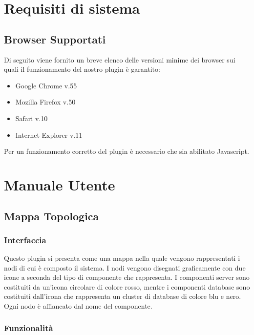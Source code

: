 \section{Requisiti di sistema}
\subsection{Browser Supportati}

Di seguito viene fornito un breve elenco delle versioni minime dei browser sui quali il funzionamento del nostro plugin è garantito:
\begin{itemize}
	
	\item Google Chrome v.55
	\item Mozilla Firefox v.50
	\item Safari v.10
	\item Internet Explorer v.11
	
\end{itemize}

Per un funzionamento corretto del plugin è necessario che sia abilitato Javascript.


\section{Manuale Utente}
\subsection{Mappa Topologica}
\label{sec:mtopologica}
\subsubsection{Interfaccia}
Questo plugin si presenta come una mappa nella quale vengono rappresentati i nodi di cui è composto il sistema.
I nodi vengono disegnati graficamente con due icone a seconda del tipo di componente che rappresenta. I componenti server sono costituiti da un'icona circolare di colore rosso, mentre i componenti database sono costituiti dall'icona che rappresenta un cluster di database di colore blu e nero. Ogni nodo è affiancato dal nome del componente.

\subsubsection{Funzionalità}
